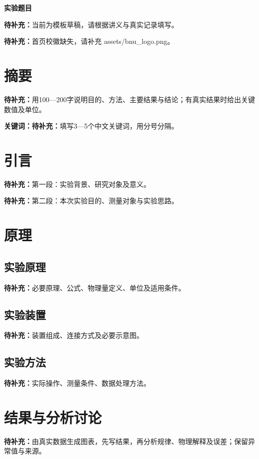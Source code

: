 \documentclass[UTF8,a4paper,12pt,fontset=fandol,scheme=plain]{ctexart}
\title{\ReportTitle}
\author{作者：\ReportBlank{2.4cm}\quad 学号：\ReportBlank{3.0cm}\\
        指导老师：\ReportBlank{2.0cm}\quad 实验时间：\ReportBlank{2.6cm}}
\date{}
\makeatletter
\newcommand{\ReportTitle}{实验题目}
\newcommand{\ReportTODO}[1]{\textbf{待补充：}#1}
\newif\ifReportLogo
\newcommand{\ReportInfo}{\@author}
\makeatother
\begin{document}
\vspace*{24mm}
\begin{center}{\songti\bfseries\fontsize{25pt}{31pt}\selectfont\ReportTitle\par}\vspace{5mm}{\ReportInfo\par}\end{center}
\vspace{15mm}
\noindent\ReportTODO{当前为模板草稿，请根据讲义与真实记录填写。}
\ifReportLogo\else
  \par\noindent\ReportTODO{首页校徽缺失，请补充 assets/bnu_logo.png。}
\fi

\section*{摘要}
\ReportTODO{用100—200字说明目的、方法、主要结果与结论；有真实结果时给出关键数值及单位。}
\par\noindent\textbf{关键词：}\ReportTODO{填写3—5个中文关键词，用分号分隔。}
\thispagestyle{plain}\clearpage

\section{引言}\label{sec:introduction}
\ReportTODO{第一段：实验背景、研究对象及意义。}

\ReportTODO{第二段：本次实验目的、测量对象与实验思路。}

\section{原理}\label{sec:principle}
\subsection{实验原理}
\ReportTODO{必要原理、公式、物理量定义、单位及适用条件。}
\subsection{实验装置}
\ReportTODO{装置组成、连接方式及必要示意图。}
\subsection{实验方法}
\ReportTODO{实际操作、测量条件、数据处理方法。}

\section{结果与分析讨论}\label{sec:results}
\ReportTODO{由真实数据生成图表，先写结果，再分析规律、物理解释及误差；保留异常值与来源。}
\end{document}
